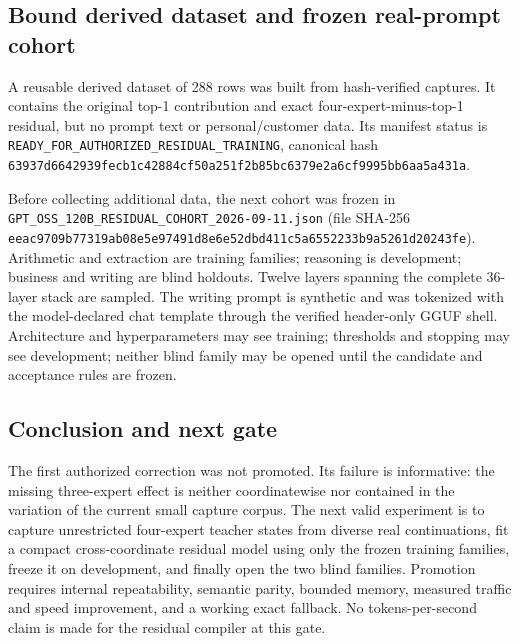 \subsection{Bound derived dataset and frozen real-prompt cohort}

A reusable derived dataset of 288 rows was built from hash-verified captures.
It contains the original top-1 contribution and exact four-expert-minus-top-1
residual, but no prompt text or personal/customer data.  Its manifest status is
\texttt{READY\_FOR\_AUTHORIZED\_RESIDUAL\_TRAINING}, canonical hash
\texttt{63937d6642939fecb1c42884cf50a251f2b85bc6379e2a6cf9995bb6aa5a431a}.

Before collecting additional data, the next cohort was frozen in
\texttt{GPT\_OSS\_120B\_RESIDUAL\_COHORT\_2026-09-11.json} (file SHA-256
\texttt{eeac9709b77319ab08e5e97491d8e6e52dbd411c5a6552233b9a5261d20243fe}).
Arithmetic and extraction are training families; reasoning is development;
business and writing are blind holdouts.  Twelve layers spanning the complete
36-layer stack are sampled.  The writing prompt is synthetic and was tokenized
with the model-declared chat template through the verified header-only GGUF
shell.  Architecture and hyperparameters may see training; thresholds and
stopping may see development; neither blind family may be opened until the
candidate and acceptance rules are frozen.

\subsection{Conclusion and next gate}

The first authorized correction was not promoted.  Its failure is informative:
the missing three-expert effect is neither coordinatewise nor contained in the
variation of the current small capture corpus.  The next valid experiment is to
capture unrestricted four-expert teacher states from diverse real continuations,
fit a compact cross-coordinate residual model using only the frozen training
families, freeze it on development, and finally open the two blind families.
Promotion requires internal repeatability, semantic parity, bounded memory,
measured traffic and speed improvement, and a working exact fallback.  No
tokens-per-second claim is made for the residual compiler at this gate.
